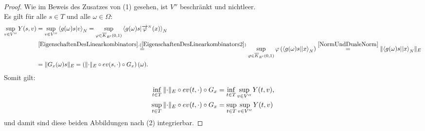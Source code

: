 \begin{proof}
Wie im Beweis des Zusatzes von (1) gesehen, ist $V''$ beschränkt und
nichtleer.\\
Es gilt für alle $s\in T$ und alle $\omega \in \Omega$:
\begin{align*}
\sup_{v \in V''}Y(s,v) &= \sup_{v\in V''}\sprod{g(\omega)s}{v}_N
=\sup_{\varphi \in \kabg{E'}01}\sprod{g(\omega)s}{\pfeil\varphi N (x)}_N\\
&\overset{\refclaim{EigenschaftenDesLinearkombinators}
{EigenschaftenDesLinearkombinators2}}=
\sup_{\varphi \in \kabg{E'}01}\varphi\left(\bprod{g(\omega)s}x_N \right)
\overset{\ref{NormUndDualeNorm}}= \norm{\bprod{g(\omega)s}x_N}_E\\
&= \norm{G_x(\omega)s}_E 
= \left(\norm\cdot_E\circ ev(s,\cdot)\circ G_x\right)(\omega)\text.
\end{align*}
Somit gilt:
\begin{align*}
\inf_{t \in T}\, \lVert\cdot\rVert_E \circ ev(t,\cdot)\circ G_x
&= \inf_{t \in T}\sup_{v \in V''}Y(t, v)\text,\\
\sup_{t \in T}\, \lVert\cdot\rVert_E \circ ev(t,\cdot)\circ G_x
&= \sup_{t \in T}\sup_{v \in V''}Y(t, v)\end{align*}
und damit sind diese beiden Abbildungen nach (2) integrierbar.
\end{proof}